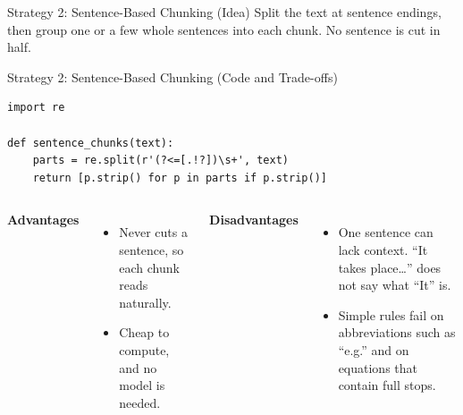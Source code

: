 \documentclass[aspectratio=169,10pt]{beamer}
\begin{document}
\begin{frame}[t]{Strategy 2: Sentence-Based Chunking (Idea)}
\small
Split the text at sentence endings, then group one or a few whole sentences into each chunk. No sentence is cut in half.
\vspace{14pt}
\begin{center}
\end{center}
\end{frame}

\begin{frame}[t,fragile]{Strategy 2: Sentence-Based Chunking (Code and Trade-offs)}
\small
\begin{lstlisting}
import re

def sentence_chunks(text):
    parts = re.split(r'(?<=[.!?])\s+', text)
    return [p.strip() for p in parts if p.strip()]
\end{lstlisting}
\vspace{6pt}
\begin{columns}[T]
\textbf{Advantages}
\begin{itemize}
  \item Never cuts a sentence, so each chunk reads naturally.
  \item Cheap to compute, and no model is needed.
\end{itemize}
\textbf{Disadvantages}
\begin{itemize}
  \item One sentence can lack context. ``It takes place\ldots'' does not say what ``It'' is.
  \item Simple rules fail on abbreviations such as ``e.g.'' and on equations that contain full stops.
\end{itemize}
\end{columns}
\end{frame}
\end{document}
